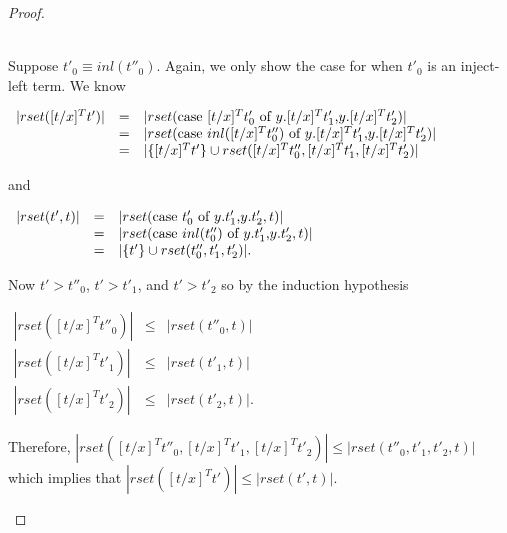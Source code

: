 \begin{proof}
\begin{itemize}
  \ \\
  Suppose $t'_0 \equiv inl(t''_0)$.  Again, we only show the case for when $t'_0$ is an inject-left term.
  We know 
  \begin{center}
    \begin{math}
      \begin{array}{lll}
        |rset([t/x]^T t')| & = & |rset(\mbox{case}\ [t/x]^T t'_0\ \text{of}\ y\text{.}[t/x]^T t'_1\text{,}y\text{.}[t/x]^T t'_2)|\\
        & = & |rset(\mbox{case}\ inl([t/x]^T t''_0)\ \text{of}\ y\text{.}[t/x]^T t'_1\text{,}y\text{.}[t/x]^T t'_2)|\\
        & = & |\{[t/x]^T t'\} \cup rset([t/x]^T t''_0, [t/x]^T t'_1, [t/x]^T t'_2)|
      \end{array}
    \end{math}
  \end{center}
  and
  \begin{center}
    \begin{math}
      \begin{array}{lll}
        |rset(t',t)| & = & |rset(\mbox{case}\ t'_0\ \text{of}\ y\text{.}t'_1\text{,}y\text{.}t'_2,t)|\\
        & = & |rset(\mbox{case}\ inl(t''_0)\ \text{of}\ y\text{.}t'_1\text{,}y\text{.}t'_2,t)|\\
        & = & |\{t'\} \cup rset(t''_0, t'_1,t'_2)|.
      \end{array}
    \end{math}
  \end{center}
  Now $t' > t''_0$, $t' > t'_1$, and $t' > t'_2$ so by the induction hypothesis
  \begin{center}
    \begin{math}
      \begin{array}{lll}
        |rset([t/x]^T t''_0)| & \leq & |rset(t''_0,t)|\\
        |rset([t/x]^T t'_1)|  & \leq & |rset(t'_1,t)|\\
        |rset([t/x]^T t'_2)|  & \leq & |rset(t'_2,t)|.
      \end{array}
    \end{math}
  \end{center}
  Therefore, $|rset([t/x]^T t''_0, [t/x]^T t'_1, [t/x]^T t'_2)| \leq |rset(t''_0, t'_1, t'_2, t)|$
  which implies that $|rset([t/x]^T t')| \leq |rset(t',t)|$.


\end{itemize}
\end{proof}

